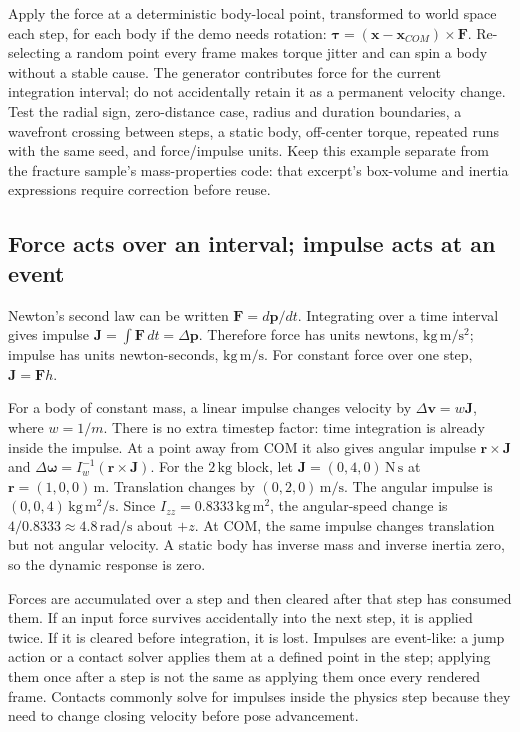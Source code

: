 Apply the force at a deterministic body-local point, transformed to world space each step, for each body if the demo needs rotation: \(\boldsymbol\tau=(\mathbf{x}-\mathbf{x}_{COM})\times\mathbf F\). Re-selecting a random point every frame makes torque jitter and can spin a body without a stable cause. The generator contributes force for the current integration interval; do not accidentally retain it as a permanent velocity change. Test the radial sign, zero-distance case, radius and duration boundaries, a wavefront crossing between steps, a static body, off-center torque, repeated runs with the same seed, and force/impulse units. Keep this example separate from the fracture sample's mass-properties code: that excerpt's box-volume and inertia expressions require correction before reuse.

\subsection{Force acts over an interval; impulse acts at an event}\label{06-engine-ii-ch034-force-acts-over-an-interval-impulse-acts-at-an-event}

\hypertarget{06-engine-ii-ch034-force-acts-over-an-interval-impulse-acts-at-an-event}{}

Newton's second law can be written \(\mathbf F=d\mathbf p/dt\). Integrating over a time interval gives impulse \(\mathbf J=\int\mathbf F\,dt=\Delta\mathbf p\). Therefore force has units newtons, \(\mathrm{kg\,m/s^2}\); impulse has units newton-seconds, \(\mathrm{kg\,m/s}\). For constant force over one step, \(\mathbf J=\mathbf Fh\).

For a body of constant mass, a linear impulse changes velocity by \(\Delta\mathbf v=w\mathbf J\), where \(w=1/m\). There is no extra timestep factor: time integration is already inside the impulse. At a point away from COM it also gives angular impulse \(\mathbf r\times\mathbf J\) and \(\Delta\boldsymbol\omega=I_w^{-1}(\mathbf r\times\mathbf J)\). For the \(2\,\mathrm{kg}\) block, let \(\mathbf J=(0,4,0)\,\mathrm{N\,s}\) at \(\mathbf r=(1,0,0)\,\mathrm m\). Translation changes by \((0,2,0)\,\mathrm{m/s}\). The angular impulse is \((0,0,4)\,\mathrm{kg\,m^2/s}\). Since \(I_{zz}=0.8333\,\mathrm{kg\,m^2}\), the angular-speed change is \(4/0.8333\approx4.8\,\mathrm{rad/s}\) about \(+z\). At COM, the same impulse changes translation but not angular velocity. A static body has inverse mass and inverse inertia zero, so the dynamic response is zero.

Forces are accumulated over a step and then cleared after that step has consumed them. If an input force survives accidentally into the next step, it is applied twice. If it is cleared before integration, it is lost. Impulses are event-like: a jump action or a contact solver applies them at a defined point in the step; applying them once after a step is not the same as applying them once every rendered frame. Contacts commonly solve for impulses inside the physics step because they need to change closing velocity before pose advancement.

